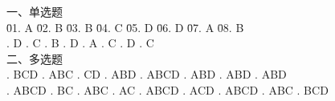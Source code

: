 \documentclass[a4paper]{article}
\begin{document}
\begin{tabbing}
一、单选题\\
\= 01. A \qquad \= 02. B \qquad \= 03. B \qquad \= 04. C \qquad \= 05. D \qquad \= 06. D \qquad \= 07. A \qquad \= 08. B \qquad \=\\
. D . C . B . D . A . C . D . C \\
二、多选题\\
. BCD  . ABC  . CD   . ABD  . ABCD . ABD  . ABD  . ABD  \\
. ABCD . BC   . ABC  . AC   . ABCD . ACD  . ABCD . ABC  . BCD
\end{tabbing}
\end{document}
